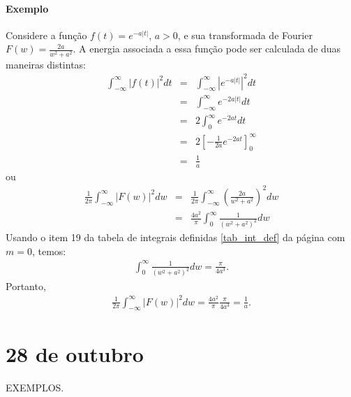 \documentclass[a4paper,10pt]{book}
\begin{document}
\subsubsection{Exemplo}
Considere a função $f(t)=e^{-a|t|}$, $a>0$, e sua transformada de Fourier $F(w)=\frac{2a}{w^2+a^2}$. A energia associada a essa função pode ser calculada de duas maneiras distintas:
\begin{eqnarray*}
\int_{-\infty}^\infty |f(t)|^2dt&=&\int_{-\infty}^\infty |e^{-a|t|}|^2dt\\
&=&\int_{-\infty}^\infty e^{-2a|t|}dt\\
&=&2\int_{0}^\infty e^{-2a t}dt\\
&=&2\left[-\frac{1}{2a} e^{-2a t}\right]_{0}^\infty\\
&=&\frac{1}{a}
\end{eqnarray*}
ou
\begin{eqnarray*}
\frac{1}{2\pi}\int_{-\infty}^\infty |F(w)|^2dw&=&\frac{1}{2\pi}\int_{-\infty}^\infty \left(\frac{2a}{w^2+a^2}\right)^2dw\\
&=&\frac{4a^2}{\pi}\int_{0}^\infty \frac{1}{\left(w^2+a^2\right)^2}dw
\end{eqnarray*}
Usando o item 19 da tabela de integrais definidas \ref{tab_int_def} da página \pageref{tab_int_def} com $m=0$, temos:
\begin{eqnarray*}
\int_{0}^\infty \frac{1}{\left(w^2+a^2\right)^2}dw=\frac{\pi}{4a^3}.
\end{eqnarray*}
Portanto,
\begin{eqnarray*}
\frac{1}{2\pi}\int_{-\infty}^\infty |F(w)|^2dw=\frac{4a^2}{\pi}\frac{\pi}{4a^3}=\frac{1}{a}.
\end{eqnarray*}


\chapter{28 de outubro}

EXEMPLOS.
\end{document}
